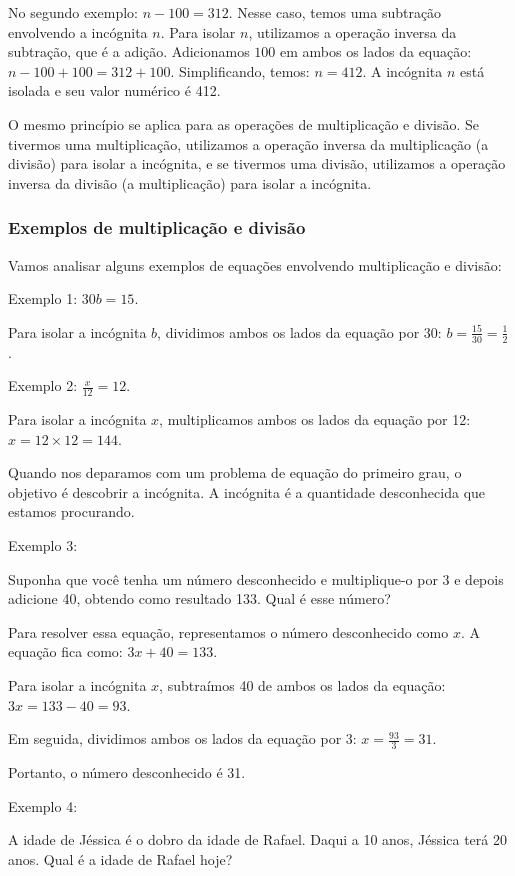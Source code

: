 {No segundo exemplo: 
$n - 100 = 312$.
Nesse caso, temos uma subtração envolvendo a incógnita $n$. Para isolar $n$, utilizamos a operação inversa da subtração, que é a adição. Adicionamos $100$ em ambos os lados da equação:
$n - 100 + 100 = 312 + 100$.
Simplificando, temos:
$n = 412$. A incógnita $n$ está isolada e seu valor numérico é 412.

O mesmo princípio se aplica para as operações de multiplicação e divisão. Se tivermos uma multiplicação, utilizamos a operação inversa da multiplicação (a divisão) para isolar a incógnita, e se tivermos uma divisão, utilizamos a operação inversa da divisão (a multiplicação) para isolar a incógnita.

\subsubsection{Exemplos de multiplicação e divisão}

Vamos analisar alguns exemplos de equações envolvendo multiplicação e divisão:


\medskip\noindent Exemplo 1: $30b = 15$.

Para isolar a incógnita $b$, dividimos ambos os lados da equação por 30:
$b = \frac{15}{30} = \frac{1}{2}$.


\medskip\noindent Exemplo 2: $\frac{x}{12} = 12$.

Para isolar a incógnita $x$, multiplicamos ambos os lados da equação por 12:
$x = 12 \times 12 = 144$.

Quando nos deparamos com um problema de equação do primeiro grau, o objetivo é descobrir a incógnita. A incógnita é a quantidade desconhecida que estamos procurando.


\medskip\noindent Exemplo 3:

Suponha que você tenha um número desconhecido e multiplique-o por 3 e depois adicione 40, obtendo como resultado 133. Qual é esse número?

Para resolver essa equação, representamos o número desconhecido como $x$. A equação fica como:
$3x + 40 = 133$.

Para isolar a incógnita $x$, subtraímos 40 de ambos os lados da equação:
$3x = 133 - 40 = 93$.

Em seguida, dividimos ambos os lados da equação por 3:
$x = \frac{93}{3} = 31$.

Portanto, o número desconhecido é 31.


\medskip\noindent Exemplo 4:

A idade de Jéssica é o dobro da idade de Rafael. Daqui a 10 anos, Jéssica terá 20 anos. Qual é a idade de Rafael hoje?

}
